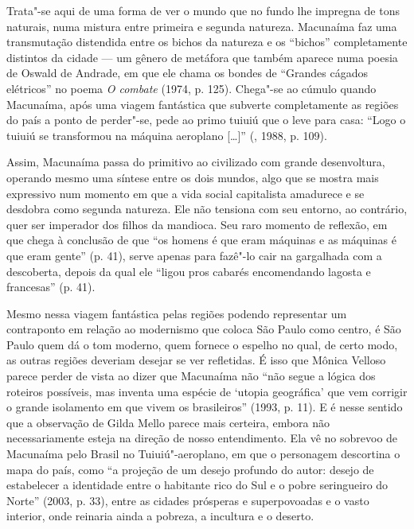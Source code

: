 Trata"-se aqui de uma forma de ver o mundo que no fundo lhe impregna de
tons naturais, numa mistura entre primeira e segunda natureza. Macunaíma
faz uma transmutação distendida entre os bichos da natureza e os
``bichos'' completamente distintos da cidade --- um gênero de metáfora
que também aparece numa poesia de Oswald de Andrade, em que ele chama os
bondes de ``Grandes cágados elétricos'' no poema \emph{O combate} (1974,
p. 125). Chega"-se ao cúmulo quando Macunaíma, após uma viagem fantástica
que subverte completamente as regiões do país a ponto de perder"-se, pede
ao primo tuiuiú que o leve para casa: ``Logo o tuiuiú se transformou na
máquina aeroplano [\ldots{}]'' (, 1988, p. 109).

Assim, Macunaíma passa do primitivo ao civilizado com grande
desenvoltura, operando mesmo uma síntese entre os dois mundos, algo que
se mostra mais expressivo num momento em que a vida social capitalista
amadurece e se desdobra como segunda natureza. Ele não tensiona com seu
entorno, ao contrário, quer ser imperador dos filhos da mandioca. Seu
raro momento de reflexão, em que chega à conclusão de que ``os homens é
que eram máquinas e as máquinas é que eram gente'' (p. 41), serve apenas
para fazê"-lo cair na gargalhada com a descoberta, depois da qual ele
``ligou pros cabarés encomendando lagosta e francesas'' (p. 41).

Mesmo nessa viagem fantástica pelas regiões podendo representar um
contraponto em relação ao modernismo que coloca São Paulo como centro, é
São Paulo quem dá o tom moderno, quem fornece o espelho no qual, de
certo modo, as outras regiões deveriam desejar se ver refletidas. É isso
que Mônica Velloso parece perder de vista ao dizer que Macunaíma não
``não segue a lógica dos roteiros possíveis, mas inventa uma espécie de
`utopia geográfica' que vem corrigir o grande isolamento em que vivem os
brasileiros'' (1993, p. 11). E é nesse sentido que a observação de
Gilda Mello parece mais certeira, embora não necessariamente esteja na
direção de nosso entendimento. Ela vê no sobrevoo de Macunaíma pelo
Brasil no Tuiuiú"-aeroplano, em que o personagem descortina o mapa do
país, como ``a projeção de um desejo profundo do autor: desejo de
estabelecer a identidade entre o habitante rico do Sul e o pobre
seringueiro do Norte'' (2003, p. 33), entre as cidades prósperas e
superpovoadas e o vasto interior, onde reinaria ainda a pobreza, a
incultura e o deserto.

